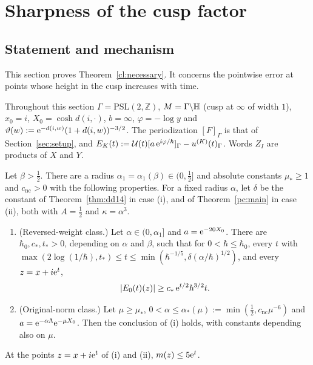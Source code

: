 \section{Sharpness of the cusp factor}\label{sec:cusp}\label{subsec:cl}
\subsection{Statement and mechanism}
This section proves Theorem~\ref{cl:necessary}. It concerns the pointwise error at points whose height in the cusp increases
with time.

Throughout this section $\Gamma=\mathrm{PSL}(2,\mathbb Z)$, $M=\Gamma\backslash\mathbb{H}$ (cusp at $\infty$ of width $1$), $x_0=i$, $X_0=\cosh d(i,\cdot)$,
$b=\infty$, $\varphi=-\log y$ and $\vartheta(w):=\mathrm{e}^{-d(i,w)}(1+d(i,w))^{-3/2}$. The periodization $[F]_\Gamma$ is that of Section~\ref{sec:setup}, and
$E_K(t):=\mathcal{U}(t)[a\,\mathrm{e}^{i\varphi/\hbar}]_\Gamma-u^{(K)}(t)_\Gamma$. Words $Z_I$ are products of $X$ and $Y$.

\begin{theorem}\label{cl:main}
Let $\beta>\tfrac12$. There are a radius $\alpha_1=\alpha_1(\beta)\in(0,\tfrac12]$ and absolute constants $\mu_*\ge1$ and $c_{\mathrm{nc}}>0$
with the following properties. For a fixed radius $\alpha$, let $\delta$ be the constant of Theorem~\ref{thm:dd14} in case (i), and of Theorem~\ref{pc:main} in case (ii), both with
$A=\tfrac12$ and $\kappa=\alpha^3$.
\begin{enumerate}
\item[(i)] (Reversed-weight class.) Let $\alpha\in(0,\alpha_1]$ and $a=\mathrm{e}^{-20X_0}$. There are $\hbar_0,c_*,t_*>0$, depending on $\alpha$ and
$\beta$, such that for $0<\hbar\le\hbar_0$, every $t$ with $\max(2\log(1/\hbar),t_*)\le t\le\min(\hbar^{-1/5},\delta(\alpha/\hbar)^{1/2})$, and
every $z=x+i\mathrm{e}^t$,
\[
|E_0(t)(z)|\ge c_*\,\mathrm{e}^{t/2}\hbar^{3/2}t .
\]
\item[(ii)] (Original-norm class.) Let $\mu\ge\mu_*$, $0<\alpha\le\alpha_*(\mu):=\min(\tfrac12,c_{\mathrm{nc}}\mu^{-6})$ and $a=\mathrm{e}^{-\alpha\Lambda}\mathrm{e}^{-\mu X_0}$.
Then the conclusion of (i) holds, with constants depending also on $\mu$.
\end{enumerate}
At the points $z=x+i\mathrm{e}^t$ of (i) and (ii), $m(z)\le5\mathrm{e}^t$.
\end{theorem}

